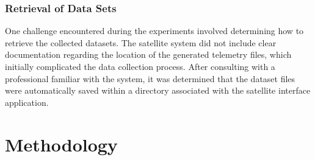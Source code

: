 \documentclass[conference]{IEEEtran}
\begin{document}
\subsubsection{Retrieval of Data Sets}
One challenge encountered during the experiments involved determining how to retrieve the collected datasets. The satellite system did not include clear documentation regarding the location of the generated telemetry files, which initially complicated the data collection process. After consulting with a professional familiar with the system, it was determined that the dataset files were automatically saved within a directory associated with the satellite interface application.

\section{Methodology}
\label{sec:methodology}
\end{document}
